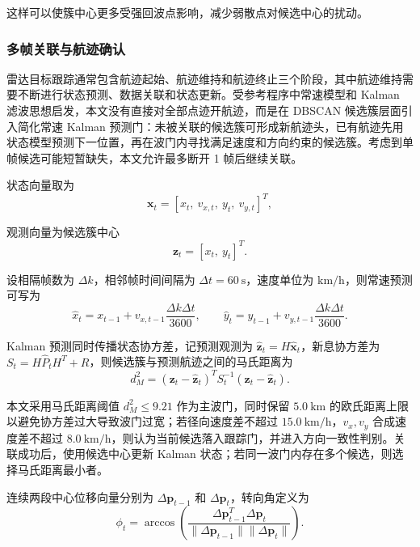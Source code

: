 \documentclass[UTF8,a4paper,12pt]{ctexart}
\numberwithin{figure}{section}
\numberwithin{table}{section}
\begin{document}
这样可以使簇中心更多受强回波点影响，减少弱散点对候选中心的扰动。

\subsubsection{多帧关联与航迹确认}

雷达目标跟踪通常包含航迹起始、航迹维持和航迹终止三个阶段，其中航迹维持需要不断进行状态预测、数据关联和状态更新。受参考程序中常速模型和 Kalman 滤波思想启发，本文没有直接对全部点迹开航迹，而是在 DBSCAN 候选簇层面引入简化常速 Kalman 预测门：未被关联的候选簇可形成新航迹头，已有航迹先用状态模型预测下一位置，再在波门内寻找满足速度和方向约束的候选簇。考虑到单帧候选可能短暂缺失，本文允许最多断开 1 帧后继续关联。

状态向量取为
\begin{equation}
  \mathbf{x}_t=[x_t,\ v_{x,t},\ y_t,\ v_{y,t}]^T,
  \label{eq:kalman_state}
\end{equation}

观测向量为候选簇中心
\begin{equation}
  \mathbf{z}_t=[x_t,\ y_t]^T.
  \label{eq:kalman_measurement}
\end{equation}

设相隔帧数为 \(\Delta k\)，相邻帧时间间隔为 \(\Delta t=60\ \mathrm{s}\)，速度单位为 \(\mathrm{km/h}\)，则常速预测可写为
\begin{equation}
  \hat{x}_t=x_{t-1}+v_{x,t-1}\frac{\Delta k\Delta t}{3600},
  \qquad
  \hat{y}_t=y_{t-1}+v_{y,t-1}\frac{\Delta k\Delta t}{3600}.
  \label{eq:predicted_position}
\end{equation}

Kalman 预测同时传播状态协方差，记预测观测为 \(\hat{\mathbf{z}}_t=H\hat{\mathbf{x}}_t\)，新息协方差为 \(S_t=H\hat{P}_tH^T+R\)，则候选簇与预测航迹之间的马氏距离为
\begin{equation}
  d_M^2=(\mathbf{z}_t-\hat{\mathbf{z}}_t)^T
  S_t^{-1}
  (\mathbf{z}_t-\hat{\mathbf{z}}_t).
  \label{eq:mahalanobis_gate}
\end{equation}

本文采用马氏距离阈值 \(d_M^2\le 9.21\) 作为主波门，同时保留 \(5.0\ \mathrm{km}\) 的欧氏距离上限以避免协方差过大导致波门过宽；若径向速度差不超过 \(15.0\ \mathrm{km/h}\)，\(v_x,v_y\) 合成速度差不超过 \(8.0\ \mathrm{km/h}\)，则认为当前候选落入跟踪门，并进入方向一致性判别。关联成功后，使用候选中心更新 Kalman 状态；若同一波门内存在多个候选，则选择马氏距离最小者。

连续两段中心位移向量分别为 \(\Delta\mathbf{p}_{t-1}\) 和 \(\Delta\mathbf{p}_t\)，转向角定义为
\begin{equation}
  \phi_t =
  \arccos
  \left(
  \frac{\Delta\mathbf{p}_{t-1}^{T}\Delta\mathbf{p}_{t}}
  {\|\Delta\mathbf{p}_{t-1}\|\|\Delta\mathbf{p}_{t}\|}
  \right).
  \label{eq:turn_angle}
\end{equation}
\end{document}
